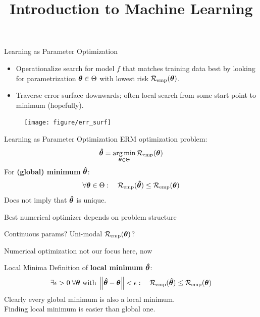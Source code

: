 \documentclass[11pt,compress,t,notes=noshow, xcolor=table]{beamer}
\title{Introduction to Machine Learning}
\begin{document}


\begin{frame}{Learning as Parameter Optimization}
\begin{itemize}
  \item Operationalize search for model $f$ that matches training data best by looking for parametrization $\bm{\theta} \in \Theta$ with lowest risk $\mathcal{R}_{\text{emp}}(\bm{\theta})$.
  \item Traverse error surface downwards; often local search from some start point to minimum (hopefully).
\end{itemize}
\vfill
\begin{center}
\begin{figure}[!b]
\texttt{[image: figure/err\_surf]}
\end{figure}
\end{center}
\end{frame}


\begin{frame}{Learning as Parameter Optimization}
ERM optimization problem:
$$
\bm{\hat\theta}  = \mathop{\mathrm{arg\,min}}_{\bm{\theta} \in \Theta} \mathcal{R}_{\text{emp}}(\bm{\theta}) 
$$
For \textbf{(global) minimum} $\bm{\hat\theta}$:
$$
\forall \bm{\theta} \in \Theta :\quad \mathcal{R}_{\text{emp}}(\bm{\hat\theta}) \leq \mathcal{R}_{\text{emp}}(\bm{\theta}) 
$$
Does not imply that $\bm{\hat\theta}$ is unique. \\
\vfill
\begin{itemizeM}
  \item Best numerical optimizer depends on problem structure
  \item Continuous params? Uni-modal $\mathcal{R}_{\text{emp}}(\bm{\theta})$? 
  \item Numerical optimization not our focus here, now
\end{itemizeM}
\end{frame}


\begin{frame}{Local Minima}
Definition of \textbf{local minimum} $\bm{\hat\theta}$:
$$
\exists \epsilon > 0\; \forall \bm{\theta} \text{ with } \left\Vert\bm{\hat\theta} - \bm{\theta}\right\Vert < \epsilon: \quad \mathcal{R}_{\text{emp}}(\bm{\hat\theta}) \leq \mathcal{R}_{\text{emp}}(\bm{\theta}) 
$$
Clearly every global minimum is also a local minimum.\\
Finding local minimum is easier than global one.
\vfill
{}
\end{frame}
\end{document}
